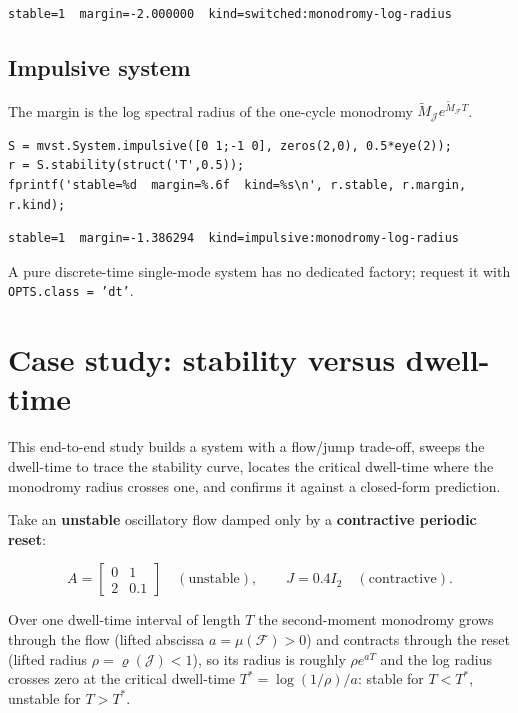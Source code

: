\documentclass[11pt,oneside]{report}
\newcommand{\code}[1]{\texttt{#1}}
\begin{document}
\begin{lstlisting}[style=outputstyle]
stable=1  margin=-2.000000  kind=switched:monodromy-log-radius
\end{lstlisting}

\hypertarget{impulsive-system}{%
\subsection{Impulsive system}\label{impulsive-system}}

The margin is the log spectral radius of the one-cycle monodromy
\(\widetilde M_{\mathcal{J}}e^{\widetilde M_{\mathcal{F}}T}\).

\begin{lstlisting}[style=matlabstyle]
S = mvst.System.impulsive([0 1;-1 0], zeros(2,0), 0.5*eye(2));
r = S.stability(struct('T',0.5));
fprintf('stable=%d  margin=%.6f  kind=%s\n', r.stable, r.margin, r.kind);
\end{lstlisting}

\begin{lstlisting}[style=outputstyle]
stable=1  margin=-1.386294  kind=impulsive:monodromy-log-radius
\end{lstlisting}

A pure discrete-time single-mode system has no dedicated factory; request it
with \code{OPTS.class = 'dt'}.

\hypertarget{case-study-stability-versus-dwell-time}{%
\section{Case study: stability versus dwell-time}\label{case-study-stability-versus-dwell-time}}

This end-to-end study builds a system with a flow/jump trade-off, sweeps
the dwell-time to trace the stability curve, locates the critical dwell-time
where the monodromy radius crosses one, and confirms it against a closed-form
prediction.

Take an \textbf{unstable} oscillatory flow damped only by a \textbf{contractive periodic
reset}:

\[A=\begin{bmatrix}0&1\\2&0.1\end{bmatrix}\quad(\text{unstable}),\qquad J=0.4 I_2\quad(\text{contractive}).\]

Over one dwell-time interval of length \(T\) the second-moment monodromy grows through
the flow (lifted abscissa \(a=\mu(\mathcal{F})>0\)) and contracts through the reset
(lifted radius \(\rho=\varrho(\mathcal{J})<1\)), so its radius is roughly
\(\rho e^{aT}\) and the log radius crosses zero at the critical dwell-time
\(T^{*}=\log(1/\rho)/a\): stable for \(T<T^{*}\), unstable for \(T>T^{*}\).
\end{document}
